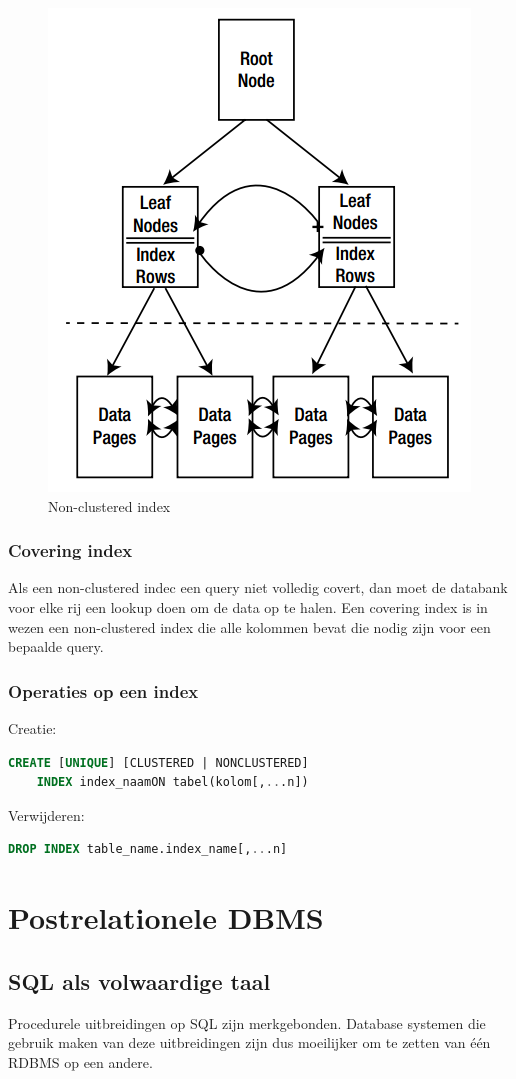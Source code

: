 \documentclass[a4paper,12pt]{article}
\begin{document}
\begin{figure}[H]
\centering
  	\includegraphics[width=.35\linewidth]{img/NonClusteredIndex.png}
  	\caption{Non-clustered index}
  	\label{fig:NonClusteredIndex}
\end{figure}

\subsubsection{Covering index}
Als een non-clustered indec een query niet volledig covert, dan moet de databank voor elke rij een lookup doen om de data op te halen.
Een covering index is in wezen een non-clustered index die alle kolommen bevat die nodig zijn voor een bepaalde query.

\subsubsection{Operaties op een index}
Creatie:
\begin{lstlisting}[language=sql, breaklines=true]
CREATE [UNIQUE] [CLUSTERED | NONCLUSTERED]
	INDEX index_naamON tabel(kolom[,...n])
\end{lstlisting}

Verwijderen:
\begin{lstlisting}[language=sql, breaklines=true]
DROP INDEX table_name.index_name[,...n]
\end{lstlisting}

\section{Postrelationele DBMS}
\subsection{SQL als volwaardige taal}
Procedurele uitbreidingen op SQL zijn merkgebonden. Database systemen die gebruik maken van deze uitbreidingen zijn dus moeilijker om te zetten van één RDBMS op een andere.
\end{document}
